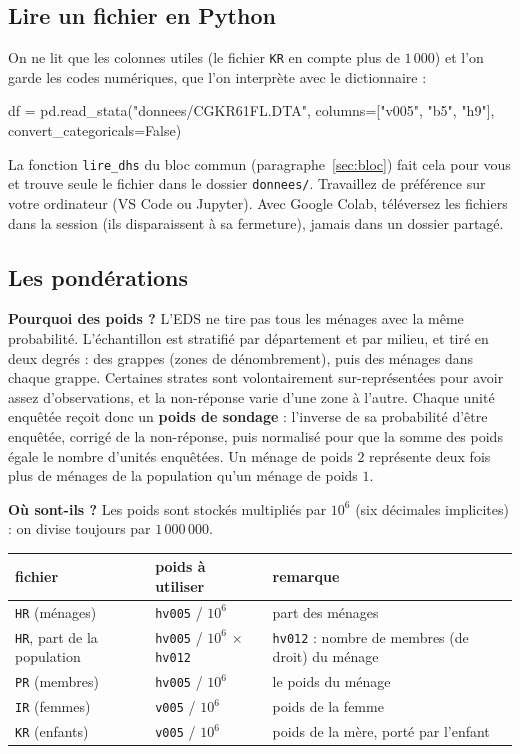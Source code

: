 \documentclass[11pt]{article}
\begin{document}
\subsection{Lire un fichier en Python}

On ne lit que les colonnes utiles (le fichier \texttt{KR} en compte plus de $1\,000$) et l'on garde les codes numériques, que l'on interprète avec le dictionnaire :
\begin{python}
df = pd.read_stata("donnees/CGKR61FL.DTA", columns=["v005", "b5", "h9"],
                   convert_categoricals=False)
\end{python}
La fonction \texttt{lire\_dhs} du bloc commun (paragraphe~\ref{sec:bloc}) fait cela pour vous et trouve seule le fichier dans le dossier \texttt{donnees/}. Travaillez de préférence sur votre ordinateur (VS Code ou Jupyter). Avec Google Colab, téléversez les fichiers dans la session (ils disparaissent à sa fermeture), jamais dans un dossier partagé.

\subsection{Les pondérations}
\label{sec:poids}

\textbf{Pourquoi des poids ?} L'EDS ne tire pas tous les ménages avec la même probabilité. L'échantillon est stratifié par département et par milieu, et tiré en deux degrés : des grappes (zones de dénombrement), puis des ménages dans chaque grappe. Certaines strates sont volontairement sur-représentées pour avoir assez d'observations, et la non-réponse varie d'une zone à l'autre. Chaque unité enquêtée reçoit donc un \textbf{poids de sondage} : l'inverse de sa probabilité d'être enquêtée, corrigé de la non-réponse, puis normalisé pour que la somme des poids égale le nombre d'unités enquêtées. Un ménage de poids $2$ \og représente \fg{} deux fois plus de ménages de la population qu'un ménage de poids $1$.

\textbf{Où sont-ils ?} Les poids sont stockés multipliés par $10^6$ (six décimales implicites) : on divise toujours par $1\,000\,000$.
\begin{center}
  \small\renewcommand{\arraystretch}{1.2}
  \begin{tabular}{lll}
    \toprule
    \textbf{fichier} & \textbf{poids à utiliser} & \textbf{remarque} \\
    \midrule
    \texttt{HR} (ménages) & \texttt{hv005} / $10^6$ & part des ménages \\
    \texttt{HR}, part de la population & \texttt{hv005} / $10^6$ $\times$ \texttt{hv012} & \texttt{hv012} : nombre de membres (de droit) du ménage \\
    \texttt{PR} (membres) & \texttt{hv005} / $10^6$ & le poids du ménage \\
    \texttt{IR} (femmes) & \texttt{v005} / $10^6$ & poids de la femme \\
    \texttt{KR} (enfants) & \texttt{v005} / $10^6$ & poids de la mère, porté par l'enfant \\
    \bottomrule
  \end{tabular}
\end{center}
\end{document}

